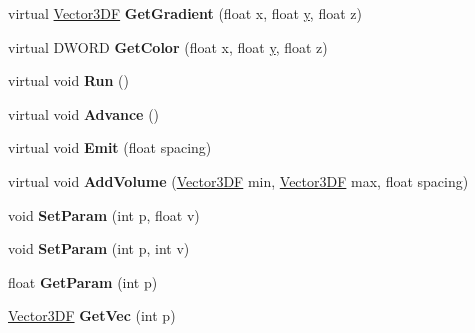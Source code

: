 \begin{DoxyCompactItemize}
\item 
\hypertarget{class_point_set_ae643e3199cb87836d389b72573251ab6}{virtual \hyperlink{class_vector3_d_f}{Vector3\+D\+F} {\bfseries Get\+Gradient} (float x, float \hyperlink{_ice_utils_8h_aa7ffaed69623192258fb8679569ff9ba}{y}, float z)}\label{class_point_set_ae643e3199cb87836d389b72573251ab6}

\item 
\hypertarget{class_point_set_ab060fdf4994ba6aac53ff831267bbf60}{virtual D\+W\+O\+R\+D {\bfseries Get\+Color} (float x, float \hyperlink{_ice_utils_8h_aa7ffaed69623192258fb8679569ff9ba}{y}, float z)}\label{class_point_set_ab060fdf4994ba6aac53ff831267bbf60}

\item 
\hypertarget{class_point_set_a1be056ac4538bfe5fd898a96e68d7906}{virtual void {\bfseries Run} ()}\label{class_point_set_a1be056ac4538bfe5fd898a96e68d7906}

\item 
\hypertarget{class_point_set_a2a329beaa1b73f94c01973d8e1422cca}{virtual void {\bfseries Advance} ()}\label{class_point_set_a2a329beaa1b73f94c01973d8e1422cca}

\item 
\hypertarget{class_point_set_af6d9adc086e3a52852a8d987ded4ebe9}{virtual void {\bfseries Emit} (float spacing)}\label{class_point_set_af6d9adc086e3a52852a8d987ded4ebe9}

\item 
\hypertarget{class_point_set_a2ead1342a3319cfe07a70508dab04642}{virtual void {\bfseries Add\+Volume} (\hyperlink{class_vector3_d_f}{Vector3\+D\+F} min, \hyperlink{class_vector3_d_f}{Vector3\+D\+F} max, float spacing)}\label{class_point_set_a2ead1342a3319cfe07a70508dab04642}

\item 
\hypertarget{class_point_set_ad1db9bb342cab88715666d2cf1bfc855}{void {\bfseries Set\+Param} (int p, float v)}\label{class_point_set_ad1db9bb342cab88715666d2cf1bfc855}

\item 
\hypertarget{class_point_set_a27ec90b7cfd6cd559e75902f7d9f5511}{void {\bfseries Set\+Param} (int p, int v)}\label{class_point_set_a27ec90b7cfd6cd559e75902f7d9f5511}

\item 
\hypertarget{class_point_set_a200e4ebcac41ab0c7b945807e4b32708}{float {\bfseries Get\+Param} (int p)}\label{class_point_set_a200e4ebcac41ab0c7b945807e4b32708}

\item 
\hypertarget{class_point_set_a4280c6974b51a2908b98c2d4eeea822c}{\hyperlink{class_vector3_d_f}{Vector3\+D\+F} {\bfseries Get\+Vec} (int p)}\label{class_point_set_a4280c6974b51a2908b98c2d4eeea822c}


\end{DoxyCompactItemize}
